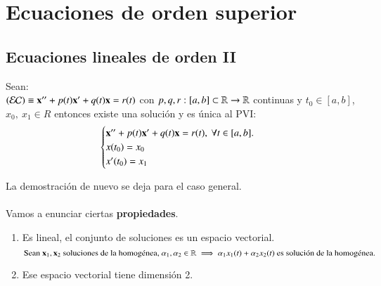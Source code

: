 
\chapter{Ecuaciones de orden superior}
\section{Ecuaciones lineales de orden II}

\begin{thm}\label{thm:exist-unic-ii}
    Sean: \\$(\mathcal{EC}) \equiv \mathbf{x}'' + p(t)\mathbf{x}' + q(t) \mathbf{x} = r(t)$ con $p, q, r: [a, b] \subset \mathbb{R} \to \mathbb{R}$ continuas y $t_0 \in [a, b]$, $x_0,\ x_1 \in R$ entonces existe una solución y es única al PVI:
    $$
        \begin{cases}
            \mathbf{x}'' + p(t)\mathbf{x}' + q(t)\mathbf{x} = r(t),\ \forall t \in [a, b].\\
            x(t_0) = x_0\\
            x'(t_0) = x_1\\
        \end{cases}
    $$
\end{thm}
La demostración de nuevo se deja para el caso general.\\\\
Vamos a enunciar ciertas \textbf{propiedades}.
\begin{enumerate} \label{properties:ecua-lin-ii}
    \item Es lineal, el conjunto de soluciones es un espacio vectorial.
    $$
        \text{Sean } \mathbf{x}_1, \mathbf{x}_2 \text{ soluciones de la homogénea, } \alpha_1, \alpha_2 \in \mathbb{R} \implies \alpha_1 x_1(t) + \alpha_2 x_2(t) \text{ es solución de la homogénea.}
    $$
    \item Ese espacio vectorial tiene dimensión 2.
\end{enumerate}
